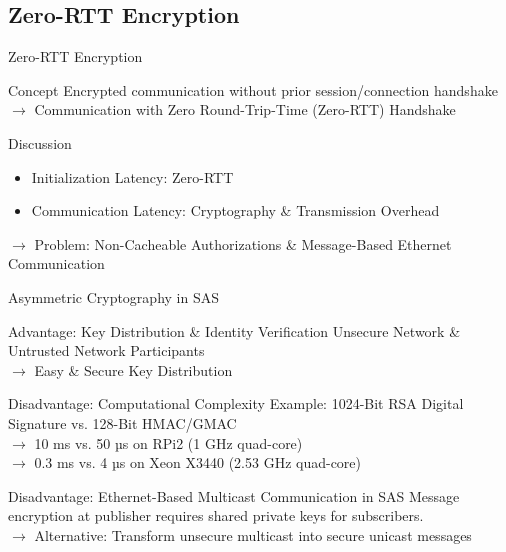 \documentclass[en]{sdqbeamer}
\begin{document}
\subsection{Zero-RTT Encryption}
\begin{frame}{Zero-RTT Encryption}
    \begin{greenblock}{Concept}
        Encrypted communication without prior session/connection handshake
        \\$\rightarrow$ Communication with Zero Round-Trip-Time (Zero-RTT) Handshake
    \end{greenblock}

    \begin{blueblock}{Discussion}
        \begin{itemize}
            \item Initialization Latency: Zero-RTT
            \item Communication Latency: Cryptography \& Transmission Overhead
        \end{itemize}
        $\rightarrow$ Problem: Non-Cacheable Authorizations \& Message-Based Ethernet Communication
    \end{blueblock}
\end{frame}

\begin{frame}{Asymmetric Cryptography in SAS}
    \begin{greenblock}{Advantage: Key Distribution \& Identity Verification}
        Unsecure Network \& Untrusted Network Participants
        \\$\rightarrow$ Easy \& Secure Key Distribution
    \end{greenblock}
    \begin{redblock}{Disadvantage: Computational Complexity \parencite{Elbez2019,Ishchenko2018}}
        Example: 1024-Bit RSA Digital Signature vs. 128-Bit HMAC/GMAC
        \\$\rightarrow$ 10 ms vs. 50 µs on RPi2 (1 GHz quad-core)
        \\$\rightarrow$ 0.3 ms vs. 4 µs on Xeon X3440 (2.53 GHz quad-core) 
    \end{redblock}
    \begin{redblock}{Disadvantage: Ethernet-Based Multicast Communication in SAS}
        Message encryption at publisher requires shared private keys for subscribers.
        \\$\rightarrow$ Alternative: Transform unsecure multicast into secure unicast messages
    \end{redblock}
\end{frame}
\end{document}
